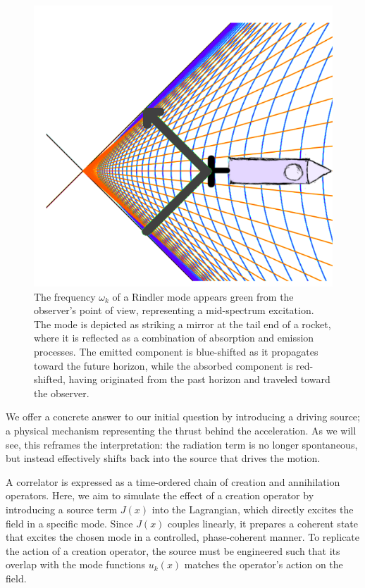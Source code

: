 \documentclass[12pt,a4paper]{article}
\begin{document}
\begin{figure}[h]
\centering
\includegraphics[scale=1.5]{emit_absorb.png}
\caption{
The frequency $\omega_k$ of a Rindler mode appears green from the observer's point of view, representing a mid-spectrum excitation. The mode is depicted as striking a mirror at the tail end of a rocket, where it is reflected as a combination of absorption and emission processes. The emitted component is blue-shifted as it propagates toward the future horizon, while the absorbed component is red-shifted, having originated from the past horizon and traveled toward the observer.}
\label{emit_absorb}
\end{figure}


We offer a concrete answer to our initial question by introducing a driving source; a physical mechanism representing the thrust behind the acceleration. As we will see, this reframes the interpretation: the radiation term is no longer spontaneous, but instead effectively shifts back into the source that drives the motion.

A correlator is expressed as a time-ordered chain of creation and annihilation operators. Here, we aim to simulate the effect of a creation operator by introducing a source term $J(x)$ into the Lagrangian, which directly excites the field in a specific mode. Since $J(x)$ couples linearly, it prepares a coherent state that excites the chosen mode in a controlled, phase-coherent manner. To replicate the action of a creation operator, the source must be engineered such that its overlap with the mode functions $u_k(x)$ matches the operator’s action on the field.
\end{document}
